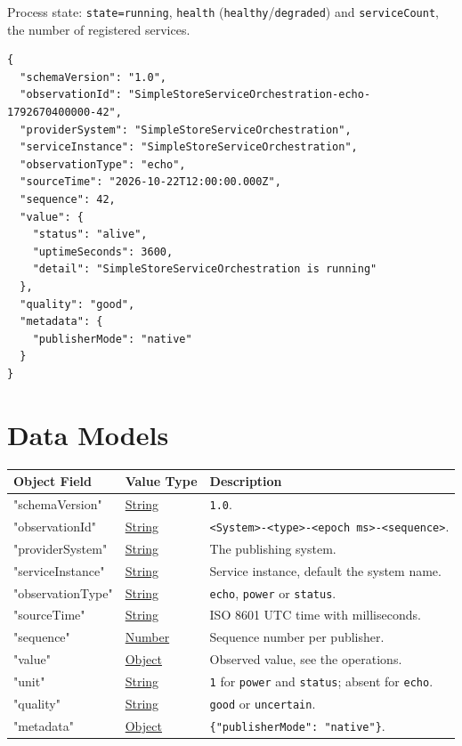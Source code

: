 \documentclass[a4paper]{arrowhead}
\newcommand{\oref}[1]{{\textcolor{ArrowheadBlue}{\hyperref[sec:operations:#1]{#1}}}}
\newcommand{\pref}[1]{{\textcolor{ArrowheadGrey}{\hyperref[sec:model:primitives:#1]{#1}}}}
\begin{document}
Process state: \texttt{state=\allowbreak{}running}, \texttt{health} (\texttt{healthy}/\texttt{degraded}) and \texttt{serviceCount}, the number of registered services.

\begin{lstlisting}[caption={An \oref{echo} observation.}]
{
  "schemaVersion": "1.0",
  "observationId": "SimpleStoreServiceOrchestration-echo-1792670400000-42",
  "providerSystem": "SimpleStoreServiceOrchestration",
  "serviceInstance": "SimpleStoreServiceOrchestration",
  "observationType": "echo",
  "sourceTime": "2026-10-22T12:00:00.000Z",
  "sequence": 42,
  "value": {
    "status": "alive",
    "uptimeSeconds": 3600,
    "detail": "SimpleStoreServiceOrchestration is running"
  },
  "quality": "good",
  "metadata": {
    "publisherMode": "native"
  }
}
\end{lstlisting}

\newpage

\section{Data Models}
\label{sec:model}


\noindent\begin{tabularx}{\textwidth}{| p{4.25cm} | p{3.5cm} | X |} \hline
\rowcolor{gray!33} Object Field & Value Type & Description \\ \hline
"schemaVersion" & \pref{String} & \texttt{1.0}. \\ \hline
"observationId" & \pref{String} & \texttt{<System>-<type>-<epoch ms>-<sequence>}. \\ \hline
"providerSystem" & \pref{String} & The publishing system. \\ \hline
"serviceInstance" & \pref{String} & Service instance, default the system name. \\ \hline
"observationType" & \pref{String} & \texttt{echo}, \texttt{power} or \texttt{status}. \\ \hline
"sourceTime" & \pref{String} & ISO 8601 UTC time with milliseconds. \\ \hline
"sequence" & \pref{Number} & Sequence number per publisher. \\ \hline
"value" & \pref{Object} & Observed value, see the operations. \\ \hline
"unit" & \pref{String} & \texttt{1} for \texttt{power} and \texttt{status}; absent for \texttt{echo}. \\ \hline
"quality" & \pref{String} & \texttt{good} or \texttt{uncertain}. \\ \hline
"metadata" & \pref{Object} & \texttt{\{"publisherMode": "native"\}}. \\ \hline
\end{tabularx}
\end{document}
